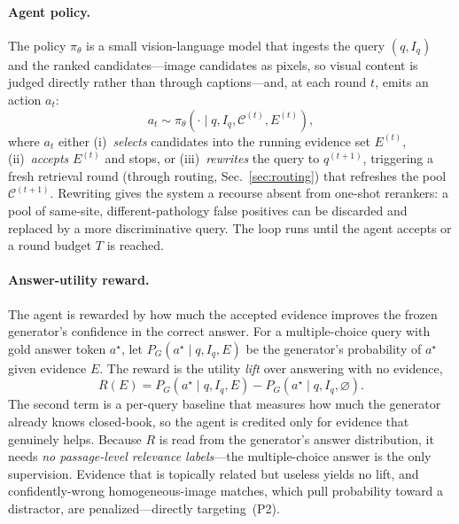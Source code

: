 \paragraph{Agent policy.}
The policy $\pi_\theta$ is a small vision-language model that ingests the query
$(q,I_q)$ and the ranked candidates---image candidates as pixels, so visual
content is judged directly rather than through captions---and, at each round
$t$, emits an action $a_t$:
\begin{equation}
  a_t \sim \pi_\theta\!\left(\cdot \mid q, I_q, \mathcal{C}^{(t)}, E^{(t)}\right),
  \label{eq:policy}
\end{equation}
where $a_t$ either (i)~\emph{selects} candidates into the running evidence set
$E^{(t)}$, (ii)~\emph{accepts} $E^{(t)}$ and stops, or (iii)~\emph{rewrites} the
query to $q^{(t+1)}$, triggering a fresh retrieval round (through routing,
Sec.~\ref{sec:routing}) that refreshes the pool $\mathcal{C}^{(t+1)}$. Rewriting
gives the system a recourse absent from one-shot rerankers: a pool of
same-site, different-pathology false positives can be discarded and replaced by
a more discriminative query. The loop runs until the agent accepts or a round
budget $T$ is reached.

\paragraph{Answer-utility reward.}
The agent is rewarded by how much the accepted evidence improves the frozen
generator's confidence in the correct answer. For a multiple-choice query with
gold answer token $a^\star$, let $P_G(a^\star \mid q, I_q, E)$ be the generator's
probability of $a^\star$ given evidence $E$. The reward is the utility
\emph{lift} over answering with no evidence,
\begin{equation}
  R(E) = P_G\!\left(a^\star \mid q, I_q, E\right)
       - P_G\!\left(a^\star \mid q, I_q, \varnothing\right).
  \label{eq:reward}
\end{equation}
The second term is a per-query baseline that measures how much the generator
already knows closed-book, so the agent is credited only for evidence that
genuinely helps. Because $R$ is read from the generator's answer distribution, it
needs \emph{no passage-level relevance labels}---the multiple-choice answer is
the only supervision. Evidence that is topically related but useless yields no
lift, and confidently-wrong homogeneous-image matches, which pull probability
toward a distractor, are penalized---directly targeting~(P2).

